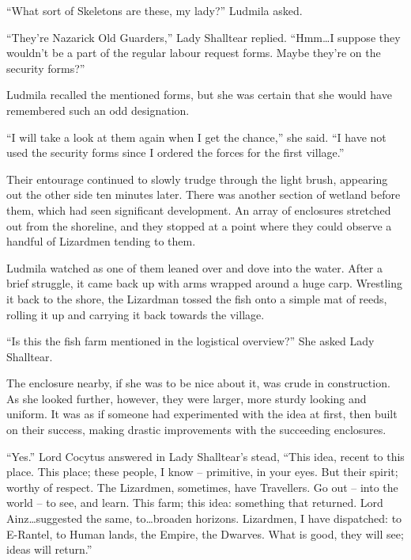 “What sort of Skeletons are these, my lady?” Ludmila asked.

 

“They’re Nazarick Old Guarders,” Lady Shalltear replied. “Hmm…I suppose they wouldn’t be a part of the regular labour request forms. Maybe they’re on the security forms?”

 

Ludmila recalled the mentioned forms, but she was certain that she would have remembered such an odd designation.

 

“I will take a look at them again when I get the chance,” she said. “I have not used the security forms since I ordered the forces for the first village.”

 

Their entourage continued to slowly trudge through the light brush, appearing out the other side ten minutes later. There was another section of wetland before them, which had seen significant development. An array of enclosures stretched out from the shoreline, and they stopped at a point where they could observe a handful of Lizardmen tending to them.

 

Ludmila watched as one of them leaned over and dove into the water. After a brief struggle, it came back up with arms wrapped around a huge carp. Wrestling it back to the shore, the Lizardman tossed the fish onto a simple mat of reeds, rolling it up and carrying it back towards the village.

 

“Is this the fish farm mentioned in the logistical overview?” She asked Lady Shalltear.

 

The enclosure nearby, if she was to be nice about it, was crude in construction. As she looked further, however, they were larger, more sturdy looking and uniform. It was as if someone had experimented with the idea at first, then built on their success, making drastic improvements with the succeeding enclosures.

 

“Yes.” Lord Cocytus answered in Lady Shalltear’s stead, “This idea, recent to this place. This place; these people, I know – primitive, in your eyes. But their spirit; worthy of respect. The Lizardmen, sometimes, have Travellers. Go out – into the world – to see, and learn. This farm; this idea: something that returned. Lord Ainz…suggested the same, to…broaden horizons. Lizardmen, I have dispatched: to E-Rantel, to Human lands, the Empire, the Dwarves. What is good, they will see; ideas will return.”

